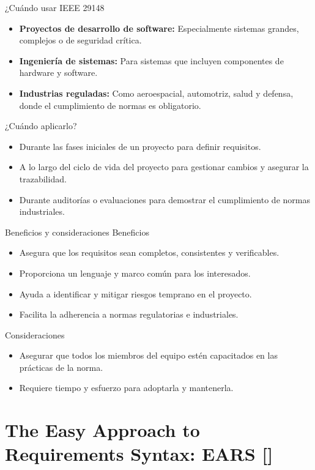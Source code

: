 \documentclass[
  24pt, %
  aspectratio=169, %
]{beamer}
\begin{document}
\begin{frame}{¿Cuándo usar IEEE 29148}
\begin{itemize}
    \item \textbf{Proyectos de desarrollo de software:} Especialmente sistemas grandes, complejos o de seguridad crítica.
    \item \textbf{Ingeniería de sistemas:} Para sistemas que incluyen componentes de hardware y software.
    \item \textbf{Industrias reguladas:} Como aeroespacial, automotriz, salud y defensa, donde el cumplimiento de normas es obligatorio.
\end{itemize}
\bigskip %
¿Cuándo aplicarlo?
\begin{itemize}
    \item Durante las fases iniciales de un proyecto para definir requisitos.
    \item A lo largo del ciclo de vida del proyecto para gestionar cambios y asegurar la trazabilidad.
    \item Durante auditorías o evaluaciones para demostrar el cumplimiento de normas industriales.
\end{itemize}
\end{frame}

\begin{frame}{Beneficios y consideraciones}
Beneficios
\begin{itemize}
\item Asegura que los requisitos sean completos, consistentes y verificables.
\item Proporciona un lenguaje y marco común para los interesados.
\item Ayuda a identificar y mitigar riesgos temprano en el proyecto.
\item Facilita la adherencia a normas regulatorias e industriales.
\end{itemize}
\bigskip %
Consideraciones
\begin{itemize}
\item Asegurar que todos los miembros del equipo estén capacitados en las prácticas de la norma.
\item Requiere tiempo y esfuerzo para adoptarla y mantenerla.
\end{itemize}
\end{frame}

\section{The Easy Approach to Requirements Syntax: EARS [\cite{ears}]}
\end{document}
